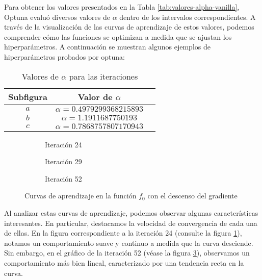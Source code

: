 Para obtener los valores presentados en la Tabla \ref{tab:valores-alpha-vanilla}, Optuna evaluó diversos valores de $\alpha$ dentro de los intervalos correspondientes. A través de la visualización de las curvas de aprendizaje de estos valores, podemos comprender cómo las funciones se optimizan a medida que se ajustan los hiperparámetros. A continuación se muestran algunos ejemplos de hiperparámetros probados por optuna:
\clearpage
\begin{table}[H]
    \centering
    \caption{Valores de $\alpha$ para las iteraciones}
    \begin{tabular}{|c|c|c|}
    \hline
    \textbf{Subfigura} & \textbf{Valor de $\alpha$} \\
    \hline
    $a$ & $\alpha = 0.4979299368215893$ \\
    \hline
    $b$ & $\alpha =  1.1911687750193$ \\
    \hline
    $c$ & $\alpha = 0.7868757807170943$ \\
    \hline
    \end{tabular}
    \label{tab:valores-alpha-vanilla-iter}
\end{table}

\begin{figure}[h!]
     \centering
     \begin{subfigure}[b]{0.45\textwidth}
         \centering
         
         \caption{Iteración 24}
         \label{fig:learning-vanilla-f0-24}
     \end{subfigure}
     \hfill
     \begin{subfigure}[b]{0.45\textwidth}
         \centering
         
         \caption{Iteración 29}
         \label{fig:learning-vanilla-f0-29}
     \end{subfigure}
     \hfill
     \begin{subfigure}[b]{0.45\textwidth}
         \centering
         
         \caption{Iteración 52}
         \label{fig:learning-vanilla-f0-52}
     \end{subfigure}
        \caption{Curvas de aprendizaje en la función $f_0$ con el descenso del gradiente}
        \label{fig:learning-curves-f0}
\end{figure}
Al analizar estas curvas de aprendizaje, podemos observar algunas características interesantes. En particular, destacamos la velocidad de convergencia de cada una de ellas. En la figura correspondiente a la iteración 24 (consulte la figura \ref{fig:learning-vanilla-f0-24}), notamos un comportamiento suave y continuo a medida que la curva desciende. Sin embargo, en el gráfico de la iteración 52 (véase la figura \ref{fig:learning-vanilla-f0-52}), observamos un comportamiento más bien lineal, caracterizado por una tendencia recta en la curva.

